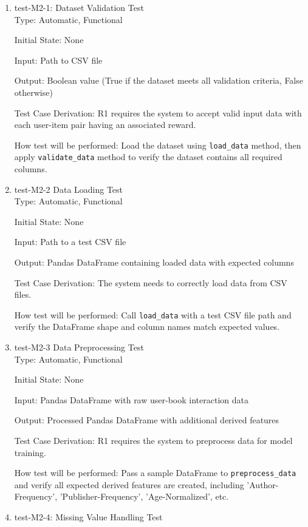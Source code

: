 \documentclass[12pt, titlepage]{article}
\begin{document}
\begin{enumerate}
  \item{test-M2-1: Dataset Validation Test\\}
  Type: Automatic, Functional
            
  Initial State: None
            
  Input: Path to CSV file
            
  Output: Boolean value (True if the dataset meets all validation criteria, False otherwise)

  Test Case Derivation: R1 requires the system to accept valid input data with each user-item pair having an associated reward.
  
  How test will be performed: 
  Load the dataset using \texttt{load\_data} method, then apply \texttt{validate\_data} method to verify the dataset contains all required columns.


  \item{test-M2-2 Data Loading Test\\}
  Type: Automatic, Functional

  Initial State: None

  Input: Path to a test CSV file

  Output: Pandas DataFrame containing loaded data with expected columns

  Test Case Derivation: The system needs to correctly load data from CSV files.

  How test will be performed: Call \texttt{load\_data} with a test CSV file path and verify the DataFrame shape and column names match expected values.

  \item{test-M2-3 Data Preprocessing Test\\}
  Type: Automatic, Functional

  Initial State: None

  Input: Pandas DataFrame with raw user-book interaction data

  Output: Processed Pandas DataFrame with additional derived features

  Test Case Derivation: R1 requires the system to preprocess data for model training.

  How test will be performed: Pass a sample DataFrame to \texttt{preprocess\_data} and verify all expected derived features are created, including 'Author-Frequency', 'Publisher-Frequency', 'Age-Normalized', etc.

  \item{test-M2-4: Missing Value Handling Test\\}
  

\end{enumerate}
\end{document}
